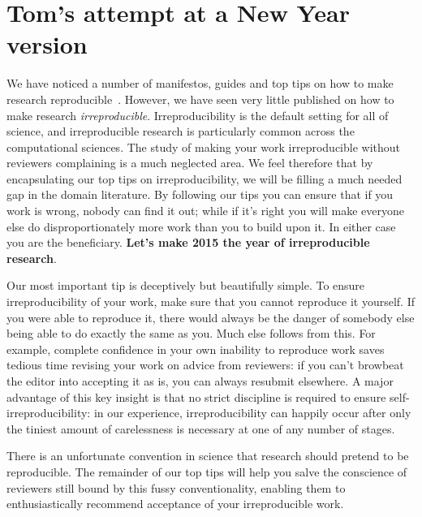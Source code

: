 \documentclass[a4paper,11pt]{article}
\begin{document}
\section{Tom's attempt at a New Year version}

We have noticed a number of manifestos, guides and top tips on how to
make research
reproducible~\cite{barnes:2010,morin-et-al:2012,sandve-et-al:2013,wilson-et-al:2014,crick-et-al_recomp2014}.
However, we have seen very little published on how to make research
\emph{irreproducible}.  Irreproducibility is the default setting for
all of science, and irreproducible research is particularly common
across the computational sciences.  The study of making your work
irreproducible without reviewers complaining is a much neglected
area. We feel therefore that by encapsulating our top tips on
irreproducibility, we will be filling a much needed gap in the domain
literature. By following our tips you can ensure that if you work is
wrong, nobody can find it out; while if it's right you will make
everyone else do disproportionately more work than you to build upon
it. In either case you are the beneficiary. {\textbf{Let's make 2015
the year of irreproducible research}}.

Our most important tip is deceptively but beautifully simple. To ensure
irreproducibility of your work, make sure that you cannot reproduce it
yourself. If you were able to reproduce it, there would always be the
danger of somebody else being able to do exactly the same as you. Much
else follows from this. For example, complete confidence in your own
inability to reproduce work saves tedious time revising your work on
advice from reviewers: if you can't browbeat the editor into accepting
it as is, you can always resubmit elsewhere. A major advantage of this key
insight is that no strict discipline is required to ensure
self-irreproducibility: in our experience, irreproducibility can
happily occur after only the tiniest amount of carelessness is
necessary at one of any number of stages.

There is an unfortunate convention in science that research should
pretend to be reproducible. The remainder of our top tips will help
you salve the conscience of reviewers still bound by this fussy
conventionality, enabling them to enthusiastically recommend
acceptance of your irreproducible work.
\end{document}
